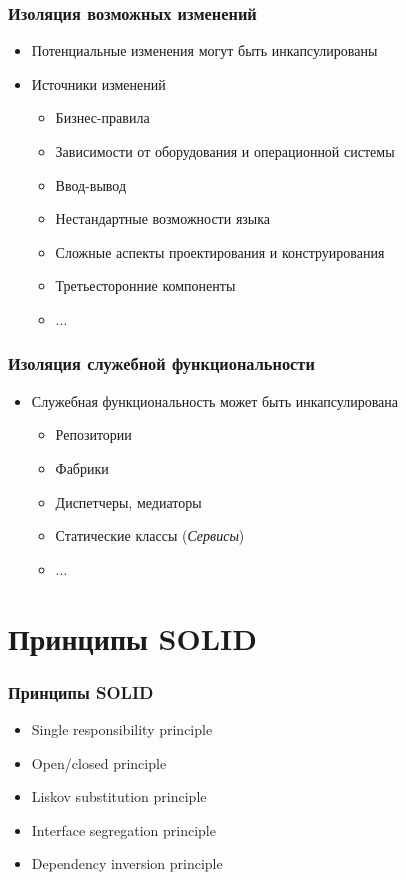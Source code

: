 \documentclass[xetex,mathserif,serif]{beamer}
\begin{document}
    \begin{frame}
        \frametitle{Изоляция возможных изменений}
        \begin{itemize}
            \item Потенциальные изменения могут быть инкапсулированы
            \item Источники изменений
            \begin{itemize}
                \item Бизнес-правила
                \item Зависимости от оборудования и операционной системы
                \item Ввод-вывод
                \item Нестандартные возможности языка
                \item Сложные аспекты проектирования и конструирования
                \item Третьесторонние компоненты
                \item ...
            \end{itemize}
        \end{itemize}
    \end{frame}

    \begin{frame}
        \frametitle{Изоляция служебной функциональности}
        \begin{itemize}
            \item Служебная функциональность может быть инкапсулирована
            \begin{itemize}
                \item Репозитории
                \item Фабрики
                \item Диспетчеры, медиаторы
                \item Статические классы (\textit{Сервисы})
                \item ...
            \end{itemize}
        \end{itemize}
    \end{frame}

    \section{Принципы SOLID}
    
    \begin{frame}
        \frametitle{Принципы SOLID}
        \begin{itemize}
            \item Single responsibility principle
            \item Open/closed principle
            \item Liskov substitution principle
            \item Interface segregation principle
            \item Dependency inversion principle
        \end{itemize}
    \end{frame}
\end{document}
